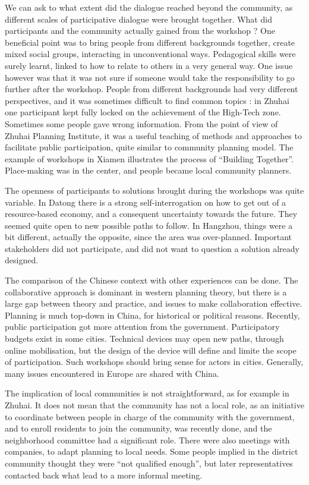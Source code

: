 \documentclass[10pt]{article}
\begin{document}
We can ask to what extent did the dialogue reached beyond the community, as different scales of participative dialogue were brought together. What did participants and the community actually gained from the workshop ? One beneficial point was to bring people from different backgrounds together, create mixed social groups, interacting in unconventional ways. Pedagogical skills were surely learnt, linked to how to relate to others in a very general way. One issue however was that it was not sure if someone would take the responsibility to go further after the workshop. People from different backgrounds had very different perspectives, and it was sometimes difficult to find common topics : in Zhuhai one participant kept fully locked on the achievement of the High-Tech zone. Sometimes some people gave wrong information. From the point of view of Zhuhai Planning Institute, it was a useful teaching of methods and approaches to facilitate public participation, quite similar to community planning model. The example of workshops in Xiamen illustrates the process of ``Building Together''. Place-making was in the center, and people became local community planners.


The openness of participants to solutions brought during the workshops was quite variable. In Datong there is a strong self-interrogation on how to get out of a resource-based economy, and a consequent uncertainty towards the future. They seemed quite open to new possible paths to follow. In Hangzhou, things were a bit different, actually the opposite, since the area was over-planned. Important stakeholders did not participate, and did not want to question a solution already designed.


The comparison of the Chinese context with other experiences can be done. The collaborative approach is dominant in western planning theory, but there is a large gap between theory and practice, and issues to make collaboration effective. Planning is much top-down in China, for historical or political reasons. Recently, public participation got more attention from the government. Participatory budgets exist in some cities. Technical devices may open new paths, through online mobilisation, but the design of the device will define and limite the scope of participation. Such workshops should bring sense for actors in cities. Generally,  many issues encountered in Europe are shared with China.


The implication of local communities is not straightforward, as for example in Zhuhai. It does not mean that the community has not a local role, as an initiative to coordinate between people in charge of the community with the government, and to enroll residents to join the community, was recently done, and the neighborhood committee had a significant role. There were also meetings with companies, to adapt planning to local needs. Some people implied in the district community thought they were ``not qualified enough'', but later representatives contacted back what lead to a more informal meeting.
\end{document}
